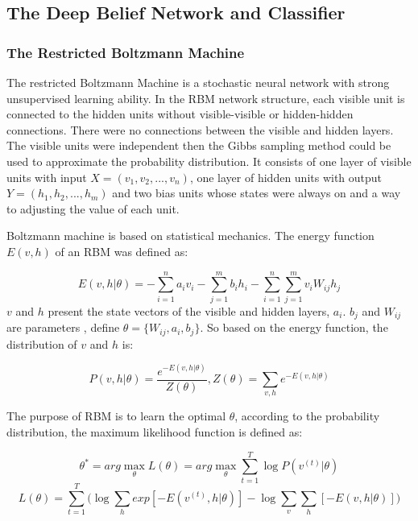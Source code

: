 \documentclass[graybox]{svmult}
\begin{document}
\subsection{The Deep Belief Network and Classifier}

\subsubsection{The Restricted Boltzmann Machine}
The restricted Boltzmann Machine is a stochastic neural network with strong unsupervised learning ability. In the RBM network structure, each visible unit is connected to the hidden units without visible-visible or hidden-hidden connections. There were no connections between the visible and hidden layers.  The visible units were independent then the Gibbs sampling method could be used to approximate the probability distribution. It consists of one layer of visible units with input $X = (v_1, v_2,...,v_n)$, one layer of hidden units with output $Y=(h_1, h_2,...,h_m)$ and two bias units whose states were always on and a way to adjusting the value of each unit.

Boltzmann machine is based on statistical mechanics. The energy function $E(v, h)$ of an RBM was defined as:

\begin{equation}
E(v,h|\theta) = -\sum_{i=1}^n{a_iv_i}-\sum_{j=1}^m{b_ih_i}-\sum_{i=1}^n\sum_{j=1}^m{v_iW_{ij}h_j}
\end{equation}
$v$ and $h$ present the state vectors of the visible and hidden layers, $a_i$. $b_j$ and $W_{ij}$ are parameters , define $\theta = \{W_{ij}, a_i, b_j\}$. So based on the energy function, the distribution of $v$ and $h$ is:


\begin{equation}
P(v,h|\theta) = \frac{e^{-E(v,h|\theta)}}{Z(\theta)}, Z(\theta) = \sum_{v,h}^{}{e^{-E(v,h|\theta)}}
\end{equation}


The purpose of RBM is to learn the optimal $\theta$, according to the probability distribution, the maximum likelihood function is defined as:

\begin{equation}
\theta^* = arg\max\limits_{\theta}L(\theta) = arg\max\limits_{\theta}\sum_{t=1}^T{\log P(v^{(t)}|\theta)}
\end{equation}
\begin{equation}
L(\theta) = \sum_{t=1}^T\Bigg (\log\sum_{h}^{}{exp[-E(v^{(t)},h|\theta)]}-\log\sum_{v}^{}{\sum_{h}^{}{[-E(v,h|\theta)]}}\Bigg)
\end{equation}
\end{document}
